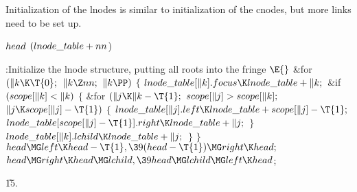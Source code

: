 Initialization of the lnodes is similar to initialization of the cnodes,
but more links need to be set up.

\Y\B\4\D$\\{head}$ \5
$(\\{lnode\_table}+\\{nn}{}$)\par
\Y\B\4:Initialize the lnode structure, putting all roots into the fringe%
\X${}\E{}$\6
\&{for} ${}(\|k\K\T{0};{}$ ${}\|k\Z\\{nn};{}$ ${}\|k\PP){}$\5
${}\{{}$\1\6
${}\\{lnode\_table}[\|k].\\{focus}\K\\{lnode\_table}+\|k;{}$\6
\&{if} ${}(\\{scope}[\|k]<\|k){}$\5
${}\{{}$\1\6
\&{for} ${}(\|j\K\|k-\T{1};{}$ ${}\\{scope}[\|j]>\\{scope}[\|k];{}$ ${}\|j\K%
\\{scope}[\|j]-\T{1}){}$\5
${}\{{}$\1\6
${}\\{lnode\_table}[\|j].\\{left}\K\\{lnode\_table}+\\{scope}[\|j]-\T{1};{}$\6
${}\\{lnode\_table}[\\{scope}[\|j]-\T{1}].\\{right}\K\\{lnode\_table}+\|j;{}$\6
\4${}\}{}$\2\6
${}\\{lnode\_table}[\|k].\\{lchild}\K\\{lnode\_table}+\|j;{}$\6
\4${}\}{}$\2\6
\4${}\}{}$\2\6
${}\\{head}\MG\\{left}\K\\{head}-\T{1},\39(\\{head}-\T{1})\MG\\{right}\K%
\\{head};{}$\6
${}\\{head}\MG\\{right}\K\\{head}\MG\\{lchild},\39\\{head}\MG\\{lchild}\MG%
\\{left}\K\\{head}{}$;\par
\U15.\fi

